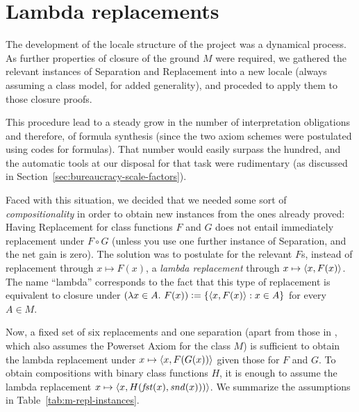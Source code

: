 \section{Lambda replacements}\label{sec:lambda-replacements}

The development of the locale structure of the project was a dynamical
process. As further properties of closure of the ground $M$ were
required, we gathered the relevant instances of Separation and
Replacement into a new locale (always assuming a class model, for
added generality), and proceded to apply them to those closure proofs.

This procedure lead to a steady grow in the number of interpretation
obligations and therefore, of formula synthesis (since the two axiom
schemes were postulated using codes for formulas). That number would
easily surpass the hundred, and the automatic tools at our disposal
for that task were rudimentary (as discussed in
Section~\ref{sec:bureaucracy-scale-factors}).

Faced with this situation, we decided that we needed some sort of
\emph{compositionality} in order to obtain new instances from the ones
already proved: Having Replacement for class functions $F$ and $G$
does not entail immediately replacement under $F\circ G$ (unless you
use one further instance of Separation, and the net gain is zero). The
solution was to postulate for the relevant $F$s, instead of
replacement through $x\mapsto F(x)$, a \emph{lambda replacement}
through $x\mapsto \langle x,F(x)\rangle$. The name “lambda” corresponds to the
fact that this type of replacement is equivalent to closure under
$(\lambda x\in A.\ F(x)) \mathrel{\mathop:}= \{ \langle x,F(x)\rangle : x\in A \}$ for every
$A\in M$.

Now, a fixed set of six replacements and one separation (apart from
those in , which also assumes the Powerset
Axiom for the class $M$) is sufficient to obtain the lambda
replacement under $x\mapsto \langle x,F(G(x))\rangle$ given those for $F$ and
$G$. To obtain compositions with binary class functions $H$, it is
enough to assume the lambda replacement
$x\mapsto \langle x,H(\mathit{fst}(x),\mathit{snd}(x)))\rangle$. We summarize
the assumptions in Table~\ref{tab:m-repl-instances}.


